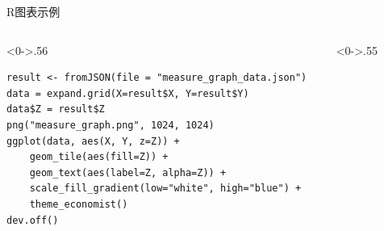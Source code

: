 \documentclass[utf8,dvipsnames,aspectratio=169]{beamer}
\begin{document}
\begin{frame}[fragile]{R图表示例}
	\begin{columns}
		\begin{column}<0->{.56\textwidth}
			\smaller[2]
			\begin{verbatim}
result <- fromJSON(file = "measure_graph_data.json")
data = expand.grid(X=result$X, Y=result$Y)
data$Z = result$Z
png("measure_graph.png", 1024, 1024)
ggplot(data, aes(X, Y, z=Z)) +
    geom_tile(aes(fill=Z)) +
    geom_text(aes(label=Z, alpha=Z)) +
    scale_fill_gradient(low="white", high="blue") +
    theme_economist()
dev.off()
			\end{verbatim}
		\end{column}
	\begin{column}<0->{.55\textwidth}
		\begin{figure}[thpb]
			\centering
			\label{fig:r2}
		\end{figure}
	\end{column}
	\end{columns}
\end{frame}
\end{document}
